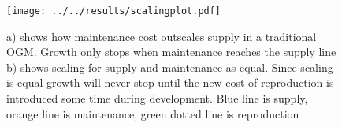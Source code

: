\documentclass[a4paper, 11pt, hidelinks]{article} %
\begin{document}
	
	
	
	
	\begin{figure}
		\centering
		\texttt{[image: ../../results/scalingplot.pdf]}
		\caption{a) shows how maintenance cost outscales supply in a traditional OGM.  Growth only stops when maintenance reaches the supply line  b) shows scaling for supply and maintenance as equal. Since scaling is equal growth will never stop until the new cost of reproduction is introduced some time during development.  Blue line is supply, orange line is maintenance, green dotted line is reproduction}
		\label{scaling_plot}
	\end{figure}
\end{document}
